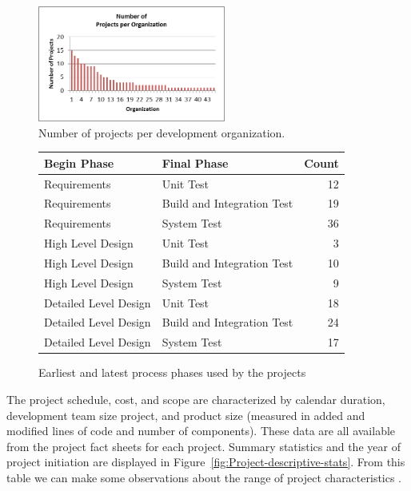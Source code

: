 \documentclass[smallcondensed]{svjour3}
\begin{document}
 
\begin{figure}[!t] 
\begin{center}
\includegraphics[height=1.5in]{img/number_of_projects_per_org.png}
\end{center} 
\caption{Number of projects per development organization.}
\label{fig:number of projects per organization}
\end{figure}


 
 
 \begin{figure}[ht]
\scriptsize
\centering
\begin{tabular}{llr} 
 Begin Phase &  Final Phase & Count  \\\hline
  Requirements      & Unit Test                   & 12  \\ 
  Requirements      & Build and Integration Test  & 19  \\ 
  Requirements      & System Test                 & 36  \\ 
  High Level Design & Unit Test                   & 3  \\ 
  High Level Design & Build and Integration Test  & 10  \\ 
  High Level Design & System Test                 & 9  \\ 
  Detailed Level Design & Unit Test                   & 18  \\ 
  Detailed Level Design & Build and Integration Test  & 24  \\ 
  Detailed Level Design & System Test                 & 17  \\ 
\end{tabular}
\caption{Earliest and latest process phases used by the projects}
\label{fig:earliest-and-least-process-phases}
\end{figure}
 


 
 The project schedule, cost, and scope  are characterized by calendar duration, development team size project, and product size (measured in added and modified lines of code and number of components).  These data are all available from the project fact sheets for each project. Summary statistics and the year of project initiation are displayed in Figure~\ref{fig:Project-descriptive-stats}. From this table we can make some observations about the range of project characteristics .
 
\end{document}
